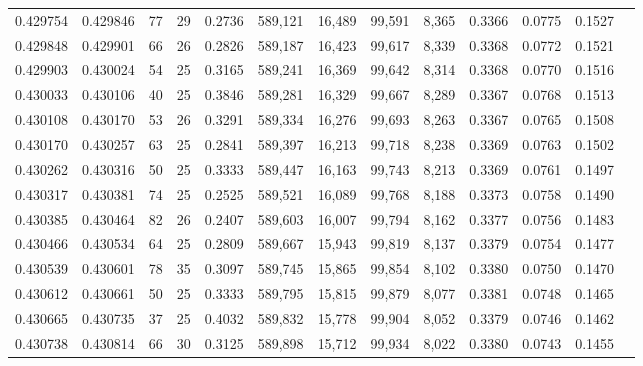 \begin{tabular}{rrrrrrrrrrrrr}
0.429754 & 0.429846 &    77 &  29 &                                     0.2736 & 589,121 &  16,489 &  99,591 &   8,365 & 0.3366 & 0.0775 & 0.1527 \\
0.429848 & 0.429901 &    66 &  26 &                                     0.2826 & 589,187 &  16,423 &  99,617 &   8,339 & 0.3368 & 0.0772 & 0.1521 \\
0.429903 & 0.430024 &    54 &  25 &                                     0.3165 & 589,241 &  16,369 &  99,642 &   8,314 & 0.3368 & 0.0770 & 0.1516 \\
0.430033 & 0.430106 &    40 &  25 &                                     0.3846 & 589,281 &  16,329 &  99,667 &   8,289 & 0.3367 & 0.0768 & 0.1513 \\
0.430108 & 0.430170 &    53 &  26 &                                     0.3291 & 589,334 &  16,276 &  99,693 &   8,263 & 0.3367 & 0.0765 & 0.1508 \\
0.430170 & 0.430257 &    63 &  25 &                                     0.2841 & 589,397 &  16,213 &  99,718 &   8,238 & 0.3369 & 0.0763 & 0.1502 \\
0.430262 & 0.430316 &    50 &  25 &                                     0.3333 & 589,447 &  16,163 &  99,743 &   8,213 & 0.3369 & 0.0761 & 0.1497 \\
0.430317 & 0.430381 &    74 &  25 &                                     0.2525 & 589,521 &  16,089 &  99,768 &   8,188 & 0.3373 & 0.0758 & 0.1490 \\
0.430385 & 0.430464 &    82 &  26 &                                     0.2407 & 589,603 &  16,007 &  99,794 &   8,162 & 0.3377 & 0.0756 & 0.1483 \\
0.430466 & 0.430534 &    64 &  25 &                                     0.2809 & 589,667 &  15,943 &  99,819 &   8,137 & 0.3379 & 0.0754 & 0.1477 \\
0.430539 & 0.430601 &    78 &  35 &                                     0.3097 & 589,745 &  15,865 &  99,854 &   8,102 & 0.3380 & 0.0750 & 0.1470 \\
0.430612 & 0.430661 &    50 &  25 &                                     0.3333 & 589,795 &  15,815 &  99,879 &   8,077 & 0.3381 & 0.0748 & 0.1465 \\
0.430665 & 0.430735 &    37 &  25 &                                     0.4032 & 589,832 &  15,778 &  99,904 &   8,052 & 0.3379 & 0.0746 & 0.1462 \\
0.430738 & 0.430814 &    66 &  30 &                                     0.3125 & 589,898 &  15,712 &  99,934 &   8,022 & 0.3380 & 0.0743 & 0.1455 \\

\end{tabular}
